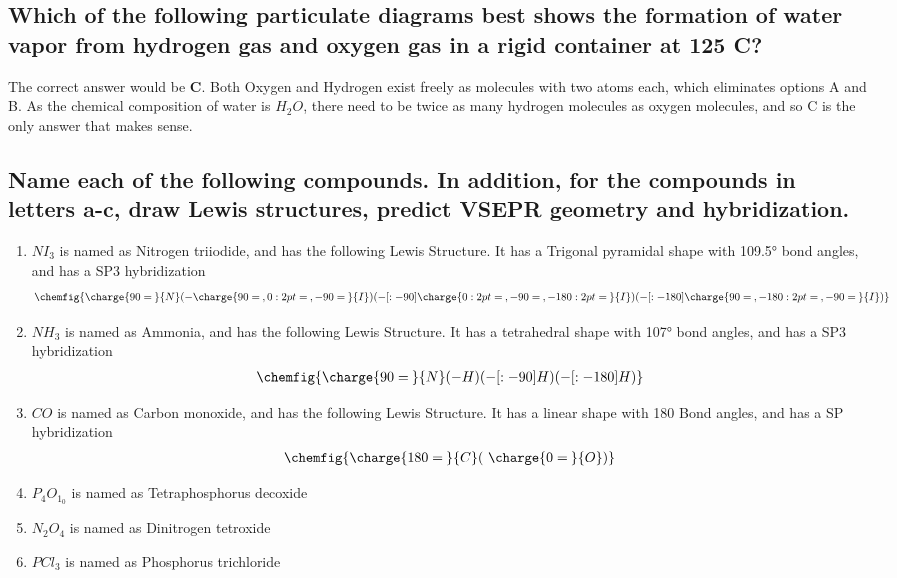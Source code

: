 \documentclass[11pt]{article}
\begin{document}
\subsection{Which of the following particulate diagrams best shows the formation of water vapor from hydrogen gas and oxygen gas in a rigid container at 125\textdegree{} C?}
\label{sec:org2c7458c}
The correct answer would be \textbf{C}. Both Oxygen and Hydrogen exist freely as molecules with two atoms each, which eliminates options A and B. As the chemical composition of water is \(H_2O\), there need to be twice as many hydrogen molecules as oxygen molecules, and so C is the only answer that makes sense.

\subsection{Name each of the following compounds. In addition, for the compounds in letters a-c, draw Lewis structures, predict VSEPR geometry and hybridization.}
\label{sec:org25931cc}
\begin{enumerate}
\item \(NI_3\) is named as Nitrogen triiodide, and has the following Lewis Structure. It has a Trigonal pyramidal shape with 109.5° bond angles, and has a SP3 hybridization
\begin{align}
\chemfig{\charge{90=\:}{N}(-\charge{90=\:, 0:2pt=\:, -90=\:}{I})(-[:-90]\charge{0:2pt=\:, -90=\:, -180:2pt=\:}{I})(-[:-180]\charge{90=\:, -180:2pt=\:, -90=\:}{I})}
\end{align}

\item \(NH_3\) is named as Ammonia, and has the following Lewis Structure. It has a tetrahedral shape with 107° bond angles, and has a SP3 hybridization
\begin{align}
\chemfig{\charge{90=\:}{N}(-{H})(-[:-90]{H})(-[:-180]{H})}
\end{align}

\item \(CO\) is named as Carbon monoxide, and has the following Lewis Structure. It has a linear shape with 180\textdegree{} Bond angles, and has a SP hybridization
\begin{align}
\chemfig{\charge{180=\:}{C}(~\charge{0=\:}{O})}
\end{align}

\item \(P_4O_1_0\) is named as Tetraphosphorus decoxide
\item \(N_2O_4\) is named as Dinitrogen tetroxide
\item \(PCl_3\) is named as Phosphorus trichloride
\end{enumerate}
\end{document}
